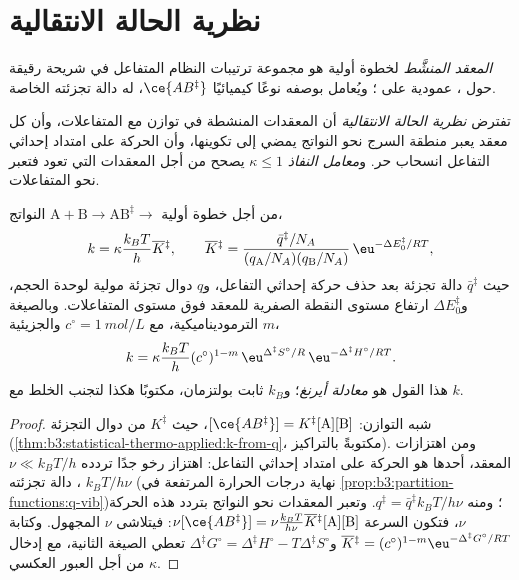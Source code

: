 \section{نظرية الحالة الانتقالية}

\begin{definition}\label{def:b3:rate-theories:activated-complex}
\emph{المعقد المنشَّط} لخطوة أولية هو
مجموعة ترتيبات النظام المتفاعل في شريحة رقيقة حول ، عمودية على ؛ ويُعامل بوصفه
نوعًا كيميائيًا $\ce{AB^{\ddagger}}$، له دالة تجزئته الخاصة.
\end{definition}

\begin{definition}\label{def:b3:rate-theories:tst}
تفترض \emph{نظرية الحالة الانتقالية} أن
المعقدات المنشطة في توازن مع المتفاعلات، وأن كل معقد
يعبر منطقة السرج نحو النواتج يمضي إلى تكوينها، وأن
الحركة على امتداد إحداثي التفاعل انسحاب حر. 
و\emph{معامل النفاذ} $\kappa \le 1$ يصحح من أجل
المعقدات التي تعود فتعبر نحو المتفاعلات.
\end{definition}

\begin{theorem}\label{thm:b3:rate-theories:eyring}
من أجل خطوة أولية $\mathrm{A + B} \to \mathrm{AB}^{\ddagger} \to$ النواتج،
\[
  k = \kappa\frac{k_BT}{h}\overline{K}{}^{\ddagger}, \qquad
  \overline{K}{}^{\ddagger} = \frac{\bar q^{\ddagger}/N_A}{(q_{\mathrm A}/N_A)(q_{\mathrm B}/N_A)}\,\eu^{-\Delta E_0^{\ddagger}/RT},
\]
حيث $\bar q^{\ddagger}$ دالة تجزئة  بعد حذف حركة
إحداثي التفاعل، و$q$ دوال تجزئة مولية لوحدة
الحجم، و$\Delta E_0^{\ddagger}$ ارتفاع مستوى النقطة الصفرية للمعقد فوق
مستوى المتفاعلات. وبالصيغة الترموديناميكية، مع $c^\circ = \qty{1}{mol/L}$ 
والجزيئية $m$،
\[
  k = \kappa\frac{k_BT}{h}(c^\circ)^{1-m}\,\eu^{\Delta^{\ddagger}S^\circ/R}\,\eu^{-\Delta^{\ddagger}H^\circ/RT}.
\]
هذا القول هو \emph{معادلة أيرنغ}؛ و$k_B$ ثابت
بولتزمان، مكتوبًا هكذا لتجنب الخلط مع $k$.
\end{theorem}

\begin{proof}
شبه التوازن: $[\ce{AB^{\ddagger}}] = K^{\ddagger}[\mathrm A][\mathrm B]$، حيث $K^{\ddagger}$ من دوال التجزئة
(\cref{thm:b3:statistical-thermo-applied:k-from-q}، مكتوبةً بالتراكيز).
ومن اهتزازات المعقد، أحدها هو الحركة على امتداد إحداثي
التفاعل: اهتزاز رخو جدًا تردده $\nu \ll k_BT/h$، دالة تجزئته
$k_BT/h\nu$ (نهاية درجات الحرارة المرتفعة في
\cref{prop:b3:partition-functions:q-vib})؛ ومنه $q^{\ddagger} = \bar q^{\ddagger}k_BT/h\nu$. 
وتعبر المعقدات نحو النواتج بتردد هذه الحركة $\nu$، فتكون
السرعة $\nu[\ce{AB^{\ddagger}}] = \nu\frac{k_BT}{h\nu}\overline{K}{}^{\ddagger}[\mathrm A][\mathrm B]$: فيتلاشى $\nu$ المجهول. وكتابة
$\overline{K}{}^{\ddagger} = (c^\circ)^{1-m}\eu^{-\Delta^{\ddagger}G^\circ/RT}$ و$\Delta^{\ddagger}G^\circ = \Delta^{\ddagger}H^\circ - T\Delta^{\ddagger}S^\circ$ تعطي
الصيغة الثانية، مع إدخال $\kappa$ من أجل العبور العكسي.
\end{proof}


